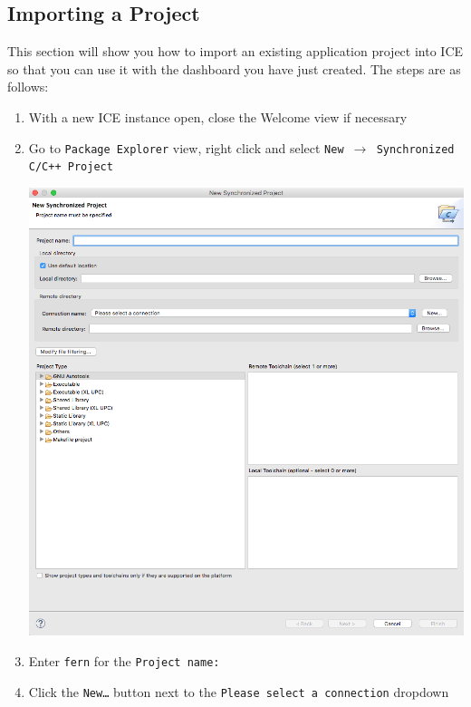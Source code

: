 \subsection{Importing a Project}

This section will show you how to import an existing application project into
ICE so that you can use it with the dashboard you have just created. The steps
are as follows:

\begin{enumerate}
\item With a new ICE instance open, close the Welcome view if necessary
\item Go to \texttt{Package Explorer} view, right click and select \texttt{New
$\rightarrow$ Synchronized C/C++ Project}

\begin{center} \includegraphics[width=\textwidth]{figures/newSyncWizard}
\end{center}

\item Enter \texttt{fern} for the \texttt{Project name:}
\item Click the \texttt{New\ldots} button next to the \texttt{Please select a
connection} dropdown


\end{enumerate}
